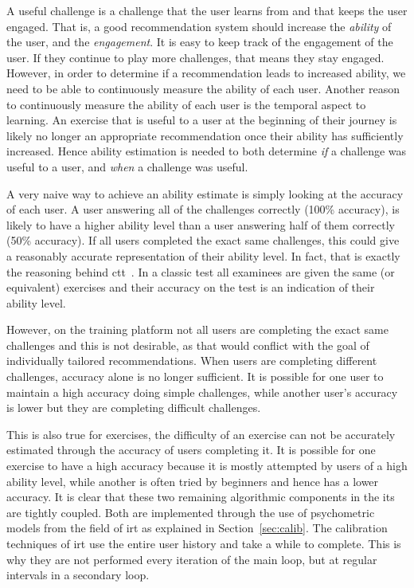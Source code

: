 A useful challenge is a challenge that the user learns from and that keeps the user engaged.
That is, a good recommendation system should increase the \textit{ability} of the user, and the \textit{engagement}.
It is easy to keep track of the engagement of the user.
If they continue to play more challenges, that means they stay engaged.
However, in order to determine if a recommendation leads to increased ability, we need to be able to continuously measure the ability of each user.
Another reason to continuously measure the ability of each user is the temporal aspect to learning.
An exercise that is useful to a user at the beginning of their journey is likely no longer an appropriate recommendation once their ability has sufficiently increased.
Hence ability estimation is needed to both determine \textit{if} a challenge was useful to a user, and \textit{when} a challenge was useful.

A very naive way to achieve an ability estimate is simply looking at the accuracy of each user.
A user answering all of the challenges correctly (100\% accuracy), is likely to have a higher ability level than a user answering half of them correctly (50\% accuracy).
If all users completed the exact same challenges, this could give a reasonably accurate representation of their ability level.
In fact, that is exactly the reasoning behind \gls{ctt}~\cite{ctt}.
In a classic test all examinees are given the same (or equivalent) exercises and their accuracy on the test is an indication of their ability level.

However, on the training platform not all users are completing the exact same challenges and this is not desirable, as that would conflict with the goal of individually tailored recommendations.
When users are completing different challenges, accuracy alone is no longer sufficient.
It is possible for one user to maintain a high accuracy doing simple challenges, while another user's accuracy is lower but they are completing difficult challenges.

This is also true for exercises, the difficulty of an exercise can not be accurately estimated through the accuracy of users completing it.
It is possible for one exercise to have a high accuracy because it is mostly attempted by users of a high ability level, while another is often tried by beginners and hence has a lower accuracy.
It is clear that these two remaining algorithmic components in the \gls{its} are tightly coupled.
Both are implemented through the use of psychometric models from the field of \gls{irt} as explained in Section~\ref{sec:calib}.
The calibration techniques of \gls{irt} use the entire user history and take a while to complete.
This is why they are not performed every iteration of the main loop, but at regular intervals in a secondary loop.
